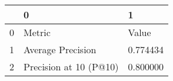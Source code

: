 \begin{tabular}{lll}
\toprule
 & 0 & 1 \\
\midrule
0 & Metric & Value \\
1 & Average Precision & 0.774434 \\
2 & Precision at 10 (P@10) & 0.800000 \\
\bottomrule
\end{tabular}
